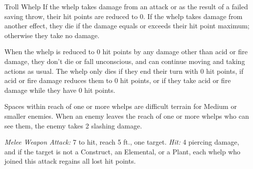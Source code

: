 \documentclass[10pt,a4paper,twoside,bg=print,twocolumn,openany,nodeprecatedcode]{dndbook}
\begin{document}
\begin{DndMonster}[float=t]{Troll Whelp}
\DndMonsterBasics[
armor-class = {15 (natural armor)},
hit-points = {\DndDice{12}},
speed = {40 ft.}
]
\DndMonsterAbilityScores[
 str = 18,
 dex = 13,
 con = 20,
 int = 7,
 wis = 9,
 cha = 7
]
\DndMonsterDetails[
saving-throws = {Con +8},
skills = {Athletics +7, Perception +2},
senses = {darkvision 60 ft., passive perception 12},
languages = {Giant},
challenge = 5,
]
If the whelp takes damage from an attack or as the result of a failed saving throw, their hit points are reduced to 0. If the whelp takes damage from another effect, they die if the damage equals or exceeds their hit point maximum; otherwise they take no damage.

When the whelp is reduced to 0 hit points by any damage other than acid or fire damage, they don't die or fall unconscious, and can continue moving and taking actions as usual. The whelp only dies if they end their turn with 0 hit points, if acid or fire damage reduces them to 0 hit points, or if they take acid or fire damage while they have 0 hit points.

Spaces within reach of one or more whelps are difficult terrain for Medium or smaller enemies. When an enemy leaves the reach of one or more whelps who can see them, the enemy takes 2 slashing damage.

\textsl{Melee Weapon Attack:} 7 to hit, reach 5 ft., one target. \textsl{Hit:} 4 piercing damage, and if the target is not a Construct, an Elemental, or a Plant, each whelp who joined this attack regains all lost hit points.

\end{DndMonster}
\end{document}
